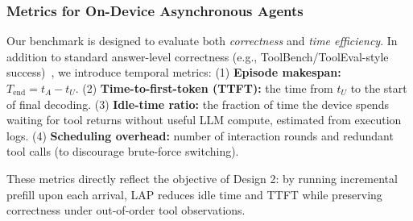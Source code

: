 \subsubsection{Metrics for On-Device Asynchronous Agents}
Our benchmark is designed to evaluate both \emph{correctness} and \emph{time efficiency}.
In addition to standard answer-level correctness (e.g., ToolBench/ToolEval-style success)~\cite{qin2023toolllm}, we introduce temporal metrics:
(1) \textbf{Episode makespan:} $T_{\text{end}} = t_A - t_U$.
(2) \textbf{Time-to-first-token (TTFT):} the time from $t_U$ to the start of final decoding.
(3) \textbf{Idle-time ratio:} the fraction of time the device spends waiting for tool returns without useful LLM compute, estimated from execution logs.
(4) \textbf{Scheduling overhead:} number of interaction rounds and redundant tool calls (to discourage brute-force switching).

These metrics directly reflect the objective of Design 2: by running incremental prefill upon each arrival, LAP reduces idle time and TTFT while preserving correctness under out-of-order tool observations.